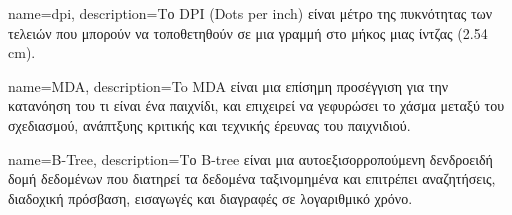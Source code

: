 {
	name={dpi},
	description={Το DPI (Dots per inch) είναι μέτρο της πυκνότητας των τελειών που μπορούν να τοποθετηθούν σε μια γραμμή στο μήκος μιας ίντζας (2.54 cm).}
}

{
	name={MDA},
	description={To MDA είναι μια επίσημη προσέγγιση για την κατανόηση του τι είναι ένα παιχνίδι, και επιχειρεί να γεφυρώσει το χάσμα μεταξύ του σχεδιασμού, ανάπτξυης κριτικής και τεχνικής έρευνας του παιχνιδιού. }	
}

{	
	name={B-Tree},
	description={Το B-tree είναι μια αυτοεξισορροπούμενη δενδροειδή δομή δεδομένων που διατηρεί τα δεδομένα ταξινομημένα και επιτρέπει αναζητήσεις, διαδοχική πρόσβαση, εισαγωγές και διαγραφές σε λογαριθμικό χρόνο. }
}